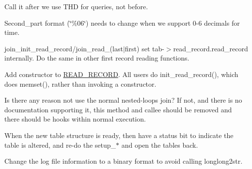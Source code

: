 \begin{DoxyRefList}
Call it after we use T\+HD for queries, not before.  
\item[\label{todo__todo000058}%
\Hypertarget{todo__todo000058}%
Member \mbox{\hyperlink{classProtocol__text_a66166244c73b0d710d2896c411514890}{Protocol\+\_\+text\+:\+:store}} (M\+Y\+S\+Q\+L\+\_\+\+T\+I\+ME $\ast$time, uint precision)]Second\+\_\+part format (\char`\"{}\%06\char`\"{}) needs to change when we support 0-\/6 decimals for time.  
\item[\label{todo__todo000081}%
\Hypertarget{todo__todo000081}%
Member \mbox{\hyperlink{group__Query__Executor_gaf6ecbbe7a1950c60e06170bce55ff70e}{Q\+E\+P\+\_\+\+T\+AB\+:\+:pick\+\_\+table\+\_\+access\+\_\+method}} (const \mbox{\hyperlink{classJOIN__TAB}{J\+O\+I\+N\+\_\+\+T\+AB}} $\ast$join\+\_\+tab)]join\+\_\+init\+\_\+read\+\_\+record/join\+\_\+read\+\_\+(last$\vert$first) set tab-\/$>$read\+\_\+record.\+read\+\_\+record internally. Do the same in other first record reading functions.  
\item[\label{todo__todo000085}%
\Hypertarget{todo__todo000085}%
Member \mbox{\hyperlink{classQEP__TAB_a8d6de370a4036642fa57cd2554f8758b}{Q\+E\+P\+\_\+\+T\+AB\+:\+:Q\+E\+P\+\_\+\+T\+AB}} ()]Add constructor to \mbox{\hyperlink{structREAD__RECORD}{R\+E\+A\+D\+\_\+\+R\+E\+C\+O\+RD}}. All users do init\+\_\+read\+\_\+record(), which does memset(), rather than invoking a constructor.  
\item[\label{todo__todo000079}%
\Hypertarget{todo__todo000079}%
Member \mbox{\hyperlink{classQuery__result__delete_a7e1b51ad966a65afa34e0fc07c5b7a63}{Query\+\_\+result\+\_\+delete\+:\+:do\+\_\+deletes}} ()]Is there any reason not use the normal nested-\/loops join? If not, and there is no documentation supporting it, this method and callee should be removed and there should be hooks within normal execution.  
\item[\label{todo__todo000109}%
\Hypertarget{todo__todo000109}%
Member \mbox{\hyperlink{sql__prepare_8cc_a230ccb139578f6e2099fcd40a6ca57ad}{reinit\+\_\+stmt\+\_\+before\+\_\+use}} (T\+HD $\ast$thd, L\+EX $\ast$lex)]When the new table structure is ready, then have a status bit to indicate the table is altered, and re-\/do the setup\+\_\+$\ast$ and open the tables back. 
\item[\label{todo__todo000064}%
\Hypertarget{todo__todo000064}%
Member \mbox{\hyperlink{classRelay__log__info_ab4299015e0504c30685b2e3b3e093d27}{Relay\+\_\+log\+\_\+info\+:\+:flush\+\_\+info}} (bool force=F\+A\+L\+SE)]Change the log file information to a binary format to avoid calling longlong2str. 

\end{DoxyRefList}
